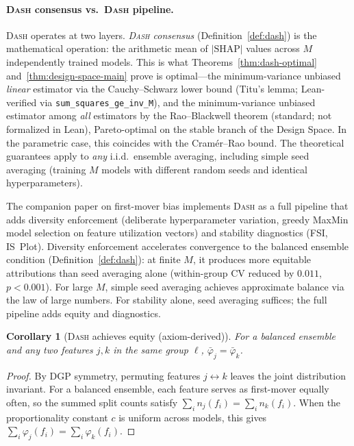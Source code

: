 \documentclass{article}
\newtheorem{corollary}[theorem]{Corollary}
\newcommand{\DASH}{\textsc{Dash}}
\begin{document}
\paragraph{\DASH{} consensus vs.\ \DASH{} pipeline.}
\DASH{} operates at two layers. \emph{\DASH{} consensus} (Definition~\ref{def:dash}) is the mathematical operation: the arithmetic mean of $|\text{SHAP}|$ values across $M$ independently trained models. This is what Theorems~\ref{thm:dash-optimal} and~\ref{thm:design-space-main} prove is optimal---the minimum-variance unbiased \emph{linear} estimator via the Cauchy--Schwarz lower bound (Titu's lemma; Lean-verified via \texttt{sum\_squares\_ge\_inv\_M}), and the minimum-variance unbiased estimator among \emph{all} estimators by the Rao--Blackwell theorem (standard; not formalized in Lean), Pareto-optimal on the stable branch of the Design Space. In the parametric case, this coincides with the Cram\'er--Rao bound. The theoretical guarantees apply to \emph{any} i.i.d.\ ensemble averaging, including simple seed averaging (training $M$ models with different random seeds and identical hyperparameters).

The companion paper on first-mover bias \citep{caraker2026firstmover} implements \DASH{} as a full pipeline that adds diversity enforcement (deliberate hyperparameter variation, greedy MaxMin model selection on feature utilization vectors) and stability diagnostics (FSI, IS~Plot). Diversity enforcement accelerates convergence to the balanced ensemble condition (Definition~\ref{def:dash}): at finite $M$, it produces more equitable attributions than seed averaging alone (within-group CV reduced by $0.011$, $p < 0.001$). For large $M$, simple seed averaging achieves approximate balance via the law of large numbers. For stability alone, seed averaging suffices; the full pipeline adds equity and diagnostics.

\begin{corollary}[\DASH{} achieves equity (axiom-derived)]
\label{cor:equity}
For a balanced ensemble and any two features $j, k$ in the same group $\ell$, $\bar{\varphi}_j = \bar{\varphi}_k$.
\end{corollary}

\begin{proof}
By DGP symmetry, permuting features $j \leftrightarrow k$ leaves the joint distribution invariant. For a balanced ensemble, each feature serves as first-mover equally often, so the summed split counts satisfy $\sum_i n_j(f_i) = \sum_i n_k(f_i)$. When the proportionality constant $c$ is uniform across models, this gives $\sum_i \varphi_j(f_i) = \sum_i \varphi_k(f_i)$.
\end{proof}
\end{document}
